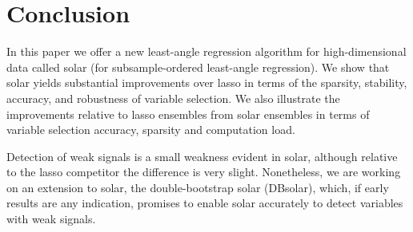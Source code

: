 \documentclass[12pt]{article}
\begin{document}

\section{Conclusion}

In this paper we offer a new least-angle regression algorithm for high-dimensional data called solar (for subsample-ordered least-angle regression). We show that solar yields substantial improvements over lasso in terms of the sparsity, stability, accuracy, and robustness of variable selection. We also illustrate the improvements relative to lasso ensembles from solar ensembles in terms of variable selection accuracy, sparsity and computation load.

Detection of weak signals is a small weakness evident in solar, although relative to the lasso competitor the difference is very slight. Nonetheless, we are working on an extension to solar, the double-bootstrap solar (DBsolar), which, if early results are any indication, promises to enable solar accurately to detect variables with weak signals.




\end{document}
